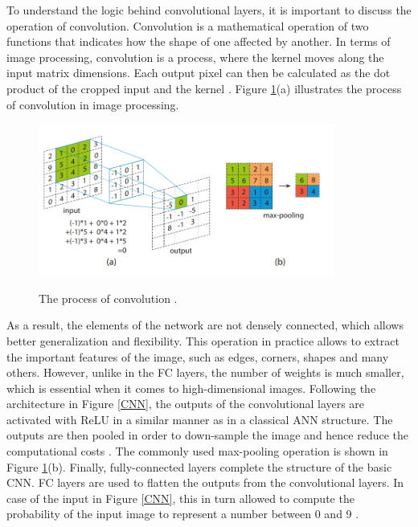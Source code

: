 \documentclass[english, 12pt, a4paper, elec, utf8, a-1b, online]{aaltothesis}
\begin{document}
To understand the logic behind convolutional layers, it is important to discuss the operation of convolution. Convolution is a mathematical operation of two functions that indicates how the shape of one affected by another. In terms of image processing, convolution is a process, where the kernel moves along the input matrix dimensions. Each output pixel can then be calculated as the dot product of the cropped input and the kernel \cite{Liu2016}. Figure \ref{CNN_1}(a) illustrates the process of convolution in image processing.  
\begin{figure}[htb]
	\begin{center}
		\includegraphics[height=5cm]{./CNN_1.png}
	\end{center}
	\caption{The process of convolution \cite{Liu2016}.}
	\begin{center}
		\label{CNN_1}
	\end{center}
\end{figure}
\FloatBarrier

As a result, the elements of the network  are not densely connected, which allows better generalization and flexibility. This operation in practice allows to extract the important features of the image, such as edges, corners, shapes and many others.  However, unlike in the FC layers, the number of weights is much smaller, which is essential when it comes to high-dimensional images. Following the architecture in Figure \ref{CNN}, the outputs of the convolutional layers are activated with ReLU in a similar manner as in a classical ANN structure. The outputs are then pooled in order to down-sample the image and hence reduce the computational costs \cite{Liu2016}. The commonly used max-pooling operation is shown in Figure \ref{CNN_1}(b). Finally, fully-connected layers complete the structure of the basic CNN. FC layers are used to flatten the outputs from the convolutional layers. In case of the input in Figure \ref{CNN}, this in turn allowed to compute the probability of the input image to represent a number between 0 and 9 \cite{Mahony2019}.
\end{document}
